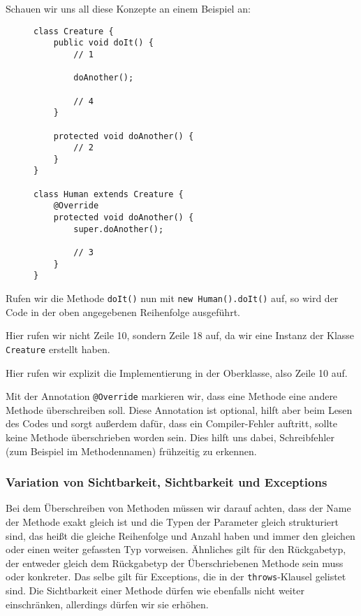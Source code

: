 		Schauen wir uns all diese Konzepte an einem Beispiel an:
		\begin{figure}[H]
			\centering
			\begin{lstlisting}
class Creature {
	public void doIt() {
		// 1

		doAnother();

		// 4
	}

	protected void doAnother() {
		// 2
	}
}

class Human extends Creature {
	@Override
	protected void doAnother() {
		super.doAnother();

		// 3
	}
}
\end{lstlisting}
		\end{figure}
		Rufen wir die Methode \lstinline|doIt()| nun mit \lstinline|new Human().doIt()| auf, so wird der Code in der oben angegebenen Reihenfolge ausgeführt.
		\begin{description}[leftmargin = 2cm]
			\item[Zeile 5] Hier rufen wir nicht Zeile 10, sondern Zeile 18 auf, da wir eine Instanz der Klasse \lstinline|Creature| erstellt haben.
			\item[Zeile 17] Hier rufen wir explizit die Implementierung in der Oberklasse, also Zeile 10 auf.
		\end{description}
	
		Mit der Annotation \lstinline|@Override| markieren wir, dass eine Methode eine andere Methode überschreiben soll. Diese Annotation ist optional, hilft aber beim Lesen des Codes und sorgt außerdem dafür, dass ein Compiler-Fehler auftritt, sollte keine Methode überschrieben worden sein. Dies hilft uns dabei, Schreibfehler (zum Beispiel im Methodennamen) frühzeitig zu erkennen.
	
	\subsubsection{Variation von Sichtbarkeit, Sichtbarkeit und Exceptions}
		Bei dem Überschreiben von Methoden müssen wir darauf achten, dass der Name der Methode exakt gleich ist und die Typen der Parameter gleich strukturiert sind, das heißt die gleiche Reihenfolge und Anzahl haben und immer den gleichen oder einen weiter gefassten Typ vorweisen. Ähnliches gilt für den Rückgabetyp, der entweder gleich dem Rückgabetyp der Überschriebenen Methode sein muss oder konkreter. Das selbe gilt für Exceptions, die in der \lstinline|throws|-Klausel gelistet sind. Die Sichtbarkeit einer Methode dürfen wie ebenfalls nicht weiter einschränken, allerdings dürfen wir sie erhöhen.
		
